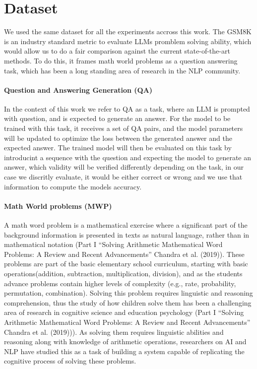 \documentclass[a4paper,10pt]{article}
\title{}
\author{Jose Rodriguez}
\begin{document}
\maketitle

\begin{abstract}

\end{abstract}

\section{Dataset}
We used the same dataset for all the experiments accross this work. The GSM8K is an industry standard metric to evaluate LLMs promblem solving ability, which would allow us to do a fair comparison against the current state-of-the-art methods. To do this, it frames math world problems as a question answering task, which has been a long standing area of research in the NLP community. 

\paragraph{Question and Answering Generation (QA)}
In the context of this work we refer to QA as a task, where an LLM is prompted with question, and is expected to generate an answer. For the model to be trained with this task, it receives  a set of QA pairs, and the model parameters will be updated to optimize the loss between the generated answer and the expected answer. The trained model will then be evaluated on this task by introducint a sequence with the question and expecting the model to generate an answer, which validity will be verified differently depending on the task, in our case we discritly evaluate, it would be either correct or wrong and we use that information to compute the models accuracy.
\paragraph{Math World problems (MWP)}
A math word problem is a mathematical exercise where a significant part of the background information is presented in texts as natural language, rather than in mathematical notation (Part I ``Solving Arithmetic Mathematical Word Problems: A Review and Recent Advancements'' Chandra et al. (2019)). These problems are part of the basic elementary school curriculum, starting with basic operations(addition, subtraction, multiplication, division), and as the students advance problems contain higher levels of complexity (e.g., rate, probability, permutation, combination). Solving this problem requires linguistic and reasoning comprehension, thus the study of how children solve them has been a challenging area of research in cognitive science and education psychology (Part I ``Solving Arithmetic Mathematical Word Problems: A Review and Recent Advancements'' Chandra et al. (2019))). As solving them requires linguistic abilities and reasoning along with knowledge of arithmetic operations, researchers on AI and NLP have studied this as a task of building a system capable of replicating the cognitive process of solving these problems. 
\end{document}
